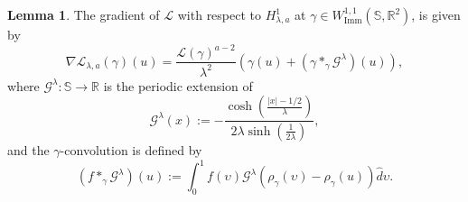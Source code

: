 \documentclass[a4paper,11pt]{amsart}
\theoremstyle{definition}\newtheorem*{definition}{Definition}
\theoremstyle{definition} \newtheorem{proposition}[theorem]{Proposition}
\theoremstyle{definition}\newtheorem{lemma}[theorem]{Lemma}
\theoremstyle{definition}\newtheorem{corollary}[theorem]{Corollary}
\theoremstyle{definition}\newtheorem{example}{Example}
\theoremstyle{remark}\newtheorem*{remark}{Remark}
\def\R{\mathbb{R}}
\def\S{\mathbb{S}}
\newcommand{\abs}[1]{\left | {#1}\right |}
\DeclareMathOperator{\imm}{Imm}
\def\length{\mathcal L}
\def\wimm{W^{1,1}_{\imm}(\S,\R^2)}
\begin{document}
\begin{lemma}\label{gradientlemma}
The gradient of $\length$ with respect to $H^1_{\lambda,a}$ at $\gamma\in \wimm$, is given by 
\begin{equation}\label{thegradient}
\nabla\length_{\lambda,a}(\gamma)(u)=\frac{\length(\gamma)^{a-2} }{\lambda^2} \left (\gamma(u)+(\gamma \ast_\gamma \mathcal G^\lambda)(u)\right ),
\end{equation}
where $\mathcal{G}^\lambda:\S\to \mathbb R$ is the periodic extension of
\begin{equation}\label{curlyg}
\mathcal{G}^\lambda(x):= -\frac{\cosh\left ( \frac{\abs{x}-1/2}{\lambda}\right )}{2\lambda \sinh\left (\frac{1}{2\lambda}\right)},
\end{equation}
and the $\gamma$-convolution is defined by
\begin{equation}\label{convolution}
(f\ast_\gamma \mathcal G^\lambda)(u):= \int_{0}^1 f(\upsilon)\mathcal{G}^\lambda(\rho_\gamma(\upsilon)-\rho_\gamma(u)) \hat d\upsilon .
\end{equation}
\end{lemma}
\end{document}
